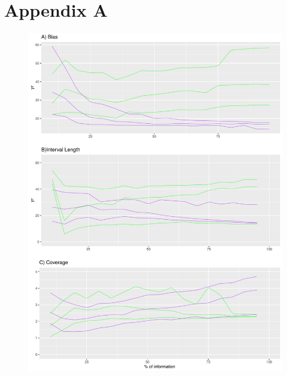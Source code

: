 \documentclass [10pt] {article}
\begin{document}
\section{Appendix A}
\begin{figure}
	\begin{centering}
		\includegraphics[width = 15cm]{AccPrec-appendix.pdf}
		\caption{}
		\label{}
	\end{centering}
\end{figure}
\end{document}
